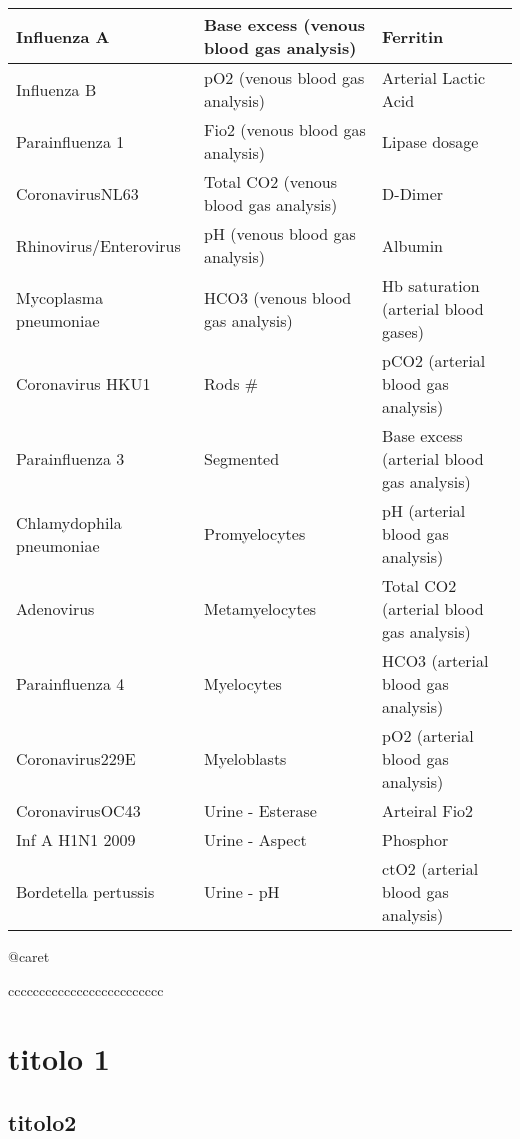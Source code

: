 \documentclass[
]{article}
\begin{document}
\begin{tabular}{l|l|l}
\hline
Influenza A & Base excess (venous blood gas analysis) & Ferritin\\
\hline
Influenza B & pO2 (venous blood gas analysis) & Arterial Lactic Acid\\
\hline
Parainfluenza 1 & Fio2 (venous blood gas analysis) & Lipase dosage\\
\hline
CoronavirusNL63 & Total CO2 (venous blood gas analysis) & D-Dimer\\
\hline
Rhinovirus/Enterovirus & pH (venous blood gas analysis) & Albumin\\
\hline
Mycoplasma pneumoniae & HCO3 (venous blood gas analysis) & Hb saturation (arterial blood gases)\\
\hline
Coronavirus HKU1 & Rods \# & pCO2 (arterial blood gas analysis)\\
\hline
Parainfluenza 3 & Segmented & Base excess (arterial blood gas analysis)\\
\hline
Chlamydophila pneumoniae & Promyelocytes & pH (arterial blood gas analysis)\\
\hline
Adenovirus & Metamyelocytes & Total CO2 (arterial blood gas analysis)\\
\hline
Parainfluenza 4 & Myelocytes & HCO3 (arterial blood gas analysis)\\
\hline
Coronavirus229E & Myeloblasts & pO2 (arterial blood gas analysis)\\
\hline
CoronavirusOC43 & Urine - Esterase & Arteiral Fio2\\
\hline
Inf A H1N1 2009 & Urine - Aspect & Phosphor\\
\hline
Bordetella pertussis & Urine - pH & ctO2 (arterial blood gas analysis)\\
\hline
\end{tabular}

\pagebreak

\pagebreak

@caret

ccccccccccccccccccccccccc

\pagebreak

\hypertarget{titolo-1}{%
\section{titolo 1}\label{titolo-1}}

\hypertarget{titolo2}{%
\subsection{titolo2}\label{titolo2}}
\end{document}
